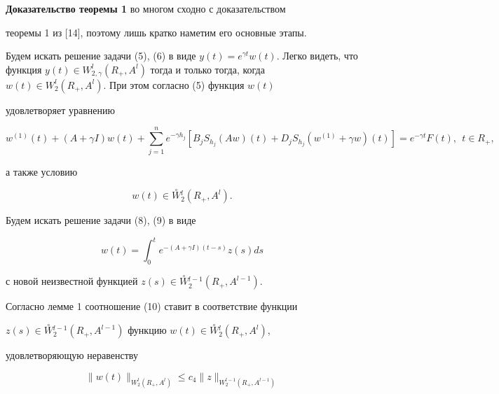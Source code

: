 {\bf Доказательство теоремы 1} во многом сходно с доказательством


теоремы 1 из [14], поэтому лишь кратко наметим его основные этапы.





Будем искать решение задачи (5), (6) в виде $y(t)=


e^{\gamma t}w(t)$. Легко видеть, что функция $y(t)\in W_{2,\gamma


}^l(R_+,A^l)$ тогда и только тогда, когда $w(t)\in


W_{2}^l(R_+,A^l)$. При этом согласно (5) функция $w(t)$


удовлетворяет уравнению


\begin{equation}


w^{(1)}(t)+(A+\gamma I)w(t)+\sum\limits_{j=1}^ne^{-\gamma h_j}[


B_jS_{h_j}(Aw)(t)+D_jS_{h_j}(w^{(1)}+\gamma w)(t)]=


e^{-\gamma t}F(t),\ \ t\in R_+, 


\end{equation}


а также условию


\begin{equation}


w(t)\in \overset{\circ}{W}{}^l_2(R_+,A^l).


\end{equation}





Будем искать решение задачи (8), (9) в виде


\begin{equation}


w(t)=\int_0^te^{-(A+\gamma I)(t-s)}z(s)ds 


\end{equation}


с новой неизвестной функцией $z(s)\in


\overset{\circ}{W}{} ^{l-1}_{2}(R_+,A^{l-1})$.


Согласно лемме 1 соотношение (10) ставит в соответствие функции


$z(s)\in \overset{\circ}{W}{}


^{l-1}_2(R_+,A^{l-1})$ функцию $w(t)\in


\overset{\circ}{W}{}_2^l(R_+,A^l)$,


удовлетворяющую неравенству


\begin{equation}


\| w(t)\|_{W^l_2(R_+,A^l)}\leq c_4\| z\|_{W^{l-1}_2(R_+,A^{l-1})}


\end{equation}



